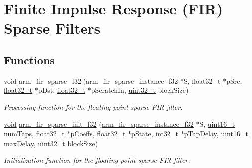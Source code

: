 \hypertarget{group___f_i_r___sparse}{\section{Finite Impulse Response (F\-I\-R) Sparse Filters}
\label{group___f_i_r___sparse}
}
\subsection*{Functions}
\begin{DoxyCompactItemize}
\item 
\hyperlink{group___n_a_m_e_ga18028b8badbf1ea7e704ccac3c488e82}{void} \hyperlink{group___f_i_r___sparse_ga23a9284de5ee39406713b91d18ac8838}{arm\-\_\-fir\-\_\-sparse\-\_\-f32} (\hyperlink{structarm__fir__sparse__instance__f32}{arm\-\_\-fir\-\_\-sparse\-\_\-instance\-\_\-f32} $\ast$S, \hyperlink{arm__math_8h_a4611b605e45ab401f02cab15c5e38715}{float32\-\_\-t} $\ast$p\-Src, \hyperlink{arm__math_8h_a4611b605e45ab401f02cab15c5e38715}{float32\-\_\-t} $\ast$p\-Dst, \hyperlink{arm__math_8h_a4611b605e45ab401f02cab15c5e38715}{float32\-\_\-t} $\ast$p\-Scratch\-In, \hyperlink{stdint_8h_a435d1572bf3f880d55459d9805097f62}{uint32\-\_\-t} block\-Size)
\begin{DoxyCompactList}\small\item\em Processing function for the floating-\/point sparse F\-I\-R filter. \end{DoxyCompactList}\item 
\hyperlink{group___n_a_m_e_ga18028b8badbf1ea7e704ccac3c488e82}{void} \hyperlink{group___f_i_r___sparse_ga86378a08a9d9e1e0e5de77843b34d396}{arm\-\_\-fir\-\_\-sparse\-\_\-init\-\_\-f32} (\hyperlink{structarm__fir__sparse__instance__f32}{arm\-\_\-fir\-\_\-sparse\-\_\-instance\-\_\-f32} $\ast$S, \hyperlink{stdint_8h_a273cf69d639a59973b6019625df33e30}{uint16\-\_\-t} num\-Taps, \hyperlink{arm__math_8h_a4611b605e45ab401f02cab15c5e38715}{float32\-\_\-t} $\ast$p\-Coeffs, \hyperlink{arm__math_8h_a4611b605e45ab401f02cab15c5e38715}{float32\-\_\-t} $\ast$p\-State, \hyperlink{group___n_a_m_e_gafd12020da5a235dfcf0c3c748fb5baed}{int32\-\_\-t} $\ast$p\-Tap\-Delay, \hyperlink{stdint_8h_a273cf69d639a59973b6019625df33e30}{uint16\-\_\-t} max\-Delay, \hyperlink{stdint_8h_a435d1572bf3f880d55459d9805097f62}{uint32\-\_\-t} block\-Size)
\begin{DoxyCompactList}\small\item\em Initialization function for the floating-\/point sparse F\-I\-R filter. \end{DoxyCompactList}\item 

\end{DoxyCompactItemize}
